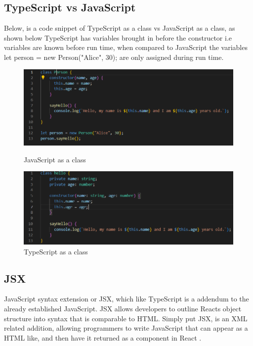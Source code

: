 \subsection{TypeScript vs JavaScript}
Below, is a code snippet of TypeScript as a class vs JavaScript as a class, as shown below TypeScript has variables brought in before the constructor i.e variables are known before run time, when compared to JavaScript the variables let person = new Person("Alice", 30); are only assigned during run time.
\begin{figure}[ht]
\begin{minipage}[b]{0.5\linewidth}
    \centering
    \includegraphics[width=\linewidth]{images/JavaScript}
    \caption{JavaScript as a class}
\end{minipage}
    \hspace{0.5cm}
    \begin{minipage}[b]{0.5\linewidth}
    \centering
   \includegraphics[width=\linewidth]{images/TypeScript}
    \caption{TypeScript as a class}
\end{minipage}
\end{figure}

\subsection{JSX}
JavaScript syntax extension or JSX, which like TypeScript is a addendum to the already established JavaScript. JSX allows developers to outline Reacts object structure into syntax that is comparable to HTML. Simply put JSX, is an XML related addition, allowing programmers to write JavaScript that can appear as a HTML like, and then have it returned as a component in React
\cite{JSX}.

